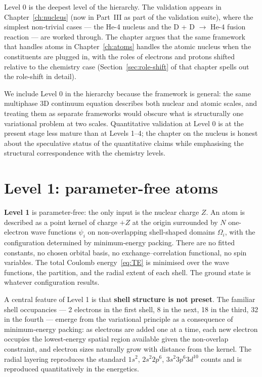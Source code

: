 Level 0 is the deepest level of the hierarchy. The validation appears in Chapter~\ref{ch:nucleus} (now in Part~III as part of the validation suite), where the simplest non-trivial cases --- the He-4 nucleus and the D + D $\to$ He-4 fusion reaction --- are worked through. The chapter argues that the same framework that handles atoms in Chapter~\ref{ch:atoms} handles the atomic nucleus when the constituents are plugged in, with the roles of electrons and protons shifted relative to the chemistry case (Section~\ref{sec:role-shift} of that chapter spells out the role-shift in detail).

We include Level 0 in the hierarchy because the framework is general: the same multiphase 3D continuum equation describes both nuclear and atomic scales, and treating them as separate frameworks would obscure what is structurally one variational problem at two scales. Quantitative validation at Level 0 is at the present stage less mature than at Levels 1--4; the chapter on the nucleus is honest about the speculative status of the quantitative claims while emphasising the structural correspondence with the chemistry levels.

\section{Level 1: parameter-free atoms}\label{sec:level1}

\textbf{Level 1} is parameter-free: the only input is the nuclear charge $Z$. An atom is described as a point kernel of charge $+Z$ at the origin surrounded by $N$ one-electron wave functions $\psi_i$ on non-overlapping shell-shaped domains $\Omega_i$, with the configuration determined by minimum-energy packing. There are no fitted constants, no chosen orbital basis, no exchange--correlation functional, no spin variables. The total Coulomb energy~\eqref{eq:TE} is minimised over the wave functions, the partition, and the radial extent of each shell. The ground state is whatever configuration results.

A central feature of Level 1 is that \textbf{shell structure is not preset}. The familiar shell occupancies --- 2 electrons in the first shell, 8 in the next, 18 in the third, 32 in the fourth --- emerge from the variational principle as a consequence of minimum-energy packing: as electrons are added one at a time, each new electron occupies the lowest-energy spatial region available given the non-overlap constraint, and electron sizes naturally grow with distance from the kernel. The radial layering reproduces the standard $1s^2$, $2s^2 2p^6$, $3s^2 3p^6 3d^{10}$ counts and is reproduced quantitatively in the energetics.

